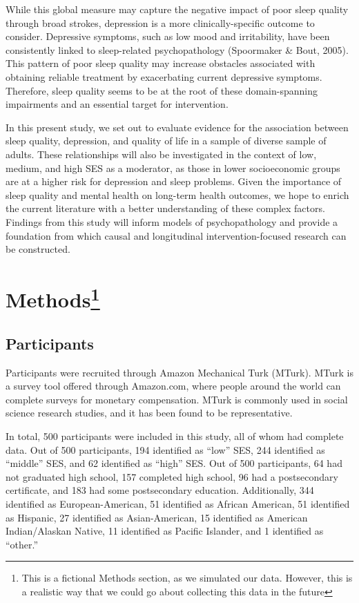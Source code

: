 \documentclass[man, noextraspace]{apa6}
\let\rmarkdownfootnote\footnote%
\def\footnote{\protect\rmarkdownfootnote}
\theoremstyle{definition}
\theoremstyle{definition}
\theoremstyle{definition}
\theoremstyle{remark}
\begin{document}
While this global measure may capture the negative impact of poor sleep
quality through broad strokes, depression is a more clinically-specific
outcome to consider. Depressive symptoms, such as low mood and
irritability, have been consistently linked to sleep-related
psychopathology (Spoormaker \& Bout, 2005). This pattern of poor sleep
quality may increase obstacles associated with obtaining reliable
treatment by exacerbating current depressive symptoms. Therefore, sleep
quality seems to be at the root of these domain-spanning impairments and
an essential target for intervention.

In this present study, we set out to evaluate evidence for the
association between sleep quality, depression, and quality of life in a
sample of diverse sample of adults. These relationships will also be
investigated in the context of low, medium, and high SES as a moderator,
as those in lower socioeconomic groups are at a higher risk for
depression and sleep problems. Given the importance of sleep quality and
mental health on long-term health outcomes, we hope to enrich the
current literature with a better understanding of these complex factors.
Findings from this study will inform models of psychopathology and
provide a foundation from which causal and longitudinal
intervention-focused research can be constructed.

\section{\texorpdfstring{Methods\footnote{This is a fictional Methods section, as we simulated our data. However, this is a realistic way that we could go about collecting this data in the future}}{Methods}}\label{methods}

\subsection{Participants}\label{participants}

Participants were recruited through Amazon Mechanical Turk (MTurk).
MTurk is a survey tool offered through Amazon.com, where people around
the world can complete surveys for monetary compensation. MTurk is
commonly used in social science research studies, and it has been found
to be representative.

In total, 500 participants were included in this study, all of whom had
complete data. Out of 500 participants, 194 identified as \enquote{low}
SES, 244 identified as \enquote{middle} SES, and 62 identified as
\enquote{high} SES. Out of 500 participants, 64 had not graduated high
school, 157 completed high school, 96 had a postsecondary certificate,
and 183 had some postsecondary education. Additionally, 344 identified
as European-American, 51 identified as African American, 51 identified
as Hispanic, 27 identified as Asian-American, 15 identified as American
Indian/Alaskan Native, 11 identified as Pacific Islander, and 1
identified as \enquote{other.}
\end{document}
